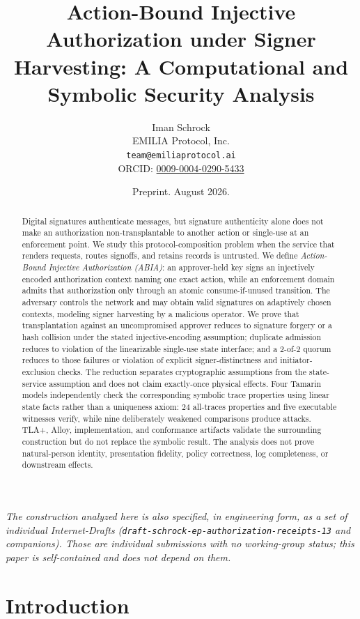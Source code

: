 \documentclass[11pt]{article}
\title{Action-Bound Injective Authorization under Signer Harvesting: A
Computational and Symbolic Security Analysis}
\author{Iman Schrock\\
EMILIA Protocol, Inc.\\
\texttt{team@emiliaprotocol.ai}\\
ORCID: \href{https://orcid.org/0009-0004-0290-5433}{0009-0004-0290-5433}}
\date{Preprint. August 2026.}
\newcommand{\code}[1]{\texttt{#1}}
\begin{document}
\maketitle

\begin{center}
\emph{The construction analyzed here is also specified, in engineering form, as a
set of individual Internet-Drafts (\code{draft-schrock-ep-authorization-receipts-13}
and companions). Those are individual submissions with no working-group status;
this paper is self-contained and does not depend on them.}
\end{center}

\begin{abstract}
Digital signatures authenticate messages, but signature authenticity alone does
not make an authorization non-transplantable to another action or single-use at
an enforcement point. We study this
protocol-composition problem when the service that renders requests, routes
signoffs, and retains records is untrusted. We define \emph{Action-Bound
Injective Authorization (ABIA)}: an approver-held key signs an injectively
encoded authorization context naming one exact action, while an enforcement
domain admits that authorization only through an atomic consume-if-unused
transition. The adversary controls the network and may obtain valid signatures
on adaptively chosen contexts, modeling signer harvesting by a malicious
operator. We prove that transplantation against an uncompromised approver
reduces to signature forgery or a hash collision under the stated
injective-encoding assumption;
duplicate admission reduces to violation of the linearizable single-use state
interface; and a 2-of-2 quorum reduces to those failures or violation of explicit
signer-distinctness and initiator-exclusion checks. The reduction separates
cryptographic assumptions from the state-service assumption and does not claim
exactly-once physical effects. Four Tamarin models independently check the
corresponding symbolic trace properties using linear state facts rather than a
uniqueness axiom: 24 all-traces properties and five executable witnesses
verify, while nine deliberately weakened comparisons produce attacks. TLA+,
Alloy,
implementation, and conformance artifacts validate the surrounding construction
but do not replace the symbolic result. The analysis does not prove
natural-person identity, presentation fidelity, policy correctness,
log completeness, or downstream effects.
\end{abstract}

\section{Introduction}
\end{document}
